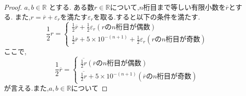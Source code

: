\documentclass[14pt]{jsarticle}
\theoremstyle{definition}
\begin{document}
\begin{proof}
$a ,b\in {\mathbb R}$ とする.
ある数$r\in {\mathbb R}$について,$n$桁目まで等しい有限小数を$\overline r$とする.
また,$r = {\overline r} + \varepsilon_r$を満たす$\varepsilon_r$を取る.すると以下の条件を満たす. \\
$$
\frac{1}{2}r = \begin{cases}
	\frac{1}{2}\overline r + \frac{1}{2}\varepsilon_r (rのn桁目が偶数) \\
	\frac{1}{2}\overline r + 5\times10^{-(n+1)} + \frac{1}{2}\varepsilon_r (rのn桁目が奇数)
	\end{cases}
$$
ここで,$$
\frac{1}{2}{\overline r} = \begin{cases}
	{\overline {\frac{1}{2}r}} ({\overline r}のn桁目が偶数) \\
	{\overline {\frac{1}{2}r}} + 5\times 10^{-(n+1)} ({\overline r}のn桁目が奇数)
\end{cases}
$$
が言える.また,$a, b\in{\mathbb R}$について


\end{proof}
\end{document}
